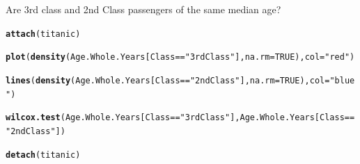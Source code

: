 \documentclass[12pt]{article}\usepackage[]{graphicx}\usepackage[]{xcolor}
\makeatletter
\newcommand{\hlnum}[1]{\textcolor[rgb]{0.686,0.059,0.569}{#1}}%
\newcommand{\hlsng}[1]{\textcolor[rgb]{0.192,0.494,0.8}{#1}}%
\newcommand{\hlopt}[1]{\textcolor[rgb]{0,0,0}{#1}}%
\newcommand{\hldef}[1]{\textcolor[rgb]{0.345,0.345,0.345}{#1}}%
\newcommand{\hlkwc}[1]{\textcolor[rgb]{0.333,0.667,0.333}{#1}}%
\newcommand{\hlkwd}[1]{\textcolor[rgb]{0.737,0.353,0.396}{\textbf{#1}}}%
\newenvironment{kframe}{%
 \def\at@end@of@kframe{}%
 \ifinner\ifhmode%
  \def\at@end@of@kframe{\end{minipage}}%
  \begin{minipage}{\columnwidth}%
 \fi\fi%
 \def\FrameCommand##1{\hskip\@totalleftmargin \hskip-\fboxsep
 \colorbox{shadecolor}{##1}\hskip-\fboxsep
     \hskip-\linewidth \hskip-\@totalleftmargin \hskip\columnwidth}%
 \MakeFramed {\advance\hsize-\width
   \@totalleftmargin\z@ \linewidth\hsize
   \@setminipage}}%
 {\par\unskip\endMakeFramed%
 \at@end@of@kframe}
\newenvironment{knitrout}{}{} %
\makeatother
\begin{document}
Are 3rd class and 2nd Class passengers of the same median age?
\begin{knitrout}
\color{fgcolor}\begin{kframe}
\begin{alltt}
\hlkwd{attach}\hldef{(titanic)}
\end{alltt}


{\ttfamily\noindent\bfseries\color{errorcolor}{\#\# Error:\\\#\# ! object 'titanic' not found}}\begin{alltt}
\hlkwd{plot}\hldef{(}\hlkwd{density}\hldef{(Age.Whole.Years[Class}\hlopt{==}\hlsng{"3rd Class"}\hldef{],}\hlkwc{na.rm}\hldef{=}\hlnum{TRUE}\hldef{),}\hlkwc{col}\hldef{=}\hlsng{"red"}\hldef{)}
\end{alltt}


{\ttfamily\noindent\bfseries\color{errorcolor}{\#\# Error:\\\#\# ! object 'Age.Whole.Years' not found}}\begin{alltt}
\hlkwd{lines}\hldef{(}\hlkwd{density}\hldef{(Age.Whole.Years[Class}\hlopt{==}\hlsng{"2nd Class"}\hldef{],}\hlkwc{na.rm}\hldef{=}\hlnum{TRUE}\hldef{),}\hlkwc{col}\hldef{=}\hlsng{"blue"}\hldef{)}
\end{alltt}


{\ttfamily\noindent\bfseries\color{errorcolor}{\#\# Error:\\\#\# ! object 'Age.Whole.Years' not found}}\begin{alltt}
\hlkwd{wilcox.test}\hldef{(Age.Whole.Years[Class}\hlopt{==}\hlsng{"3rd Class"}\hldef{],Age.Whole.Years[Class}\hlopt{==}\hlsng{"2nd Class"}\hldef{])}
\end{alltt}


{\ttfamily\noindent\bfseries\color{errorcolor}{\#\# Error:\\\#\# ! object 'Age.Whole.Years' not found}}\begin{alltt}
\hlkwd{detach}\hldef{(titanic)}
\end{alltt}


{\ttfamily\noindent\bfseries\color{errorcolor}{\#\# Error in `detach()`:\\\#\# ! invalid 'name' argument}}\end{kframe}
\end{knitrout}
\end{document}

